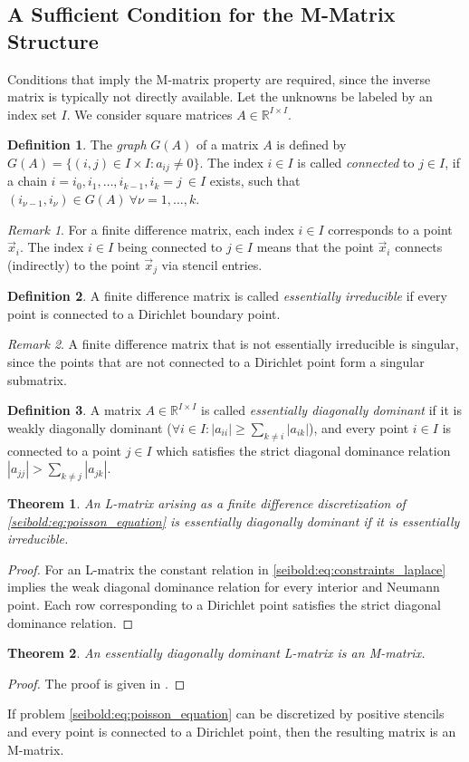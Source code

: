 \documentclass[reqno]{amsart}
\theoremstyle{plain}
\newtheorem{thm}{Theorem}
\theoremstyle{definition}
\newtheorem{defn}{Definition}
\theoremstyle{remark}
\newtheorem{rem}{Remark}
\begin{document}
\subsection{A Sufficient Condition for the M-Matrix Structure}
\label{seibold:subsec:mmatrix_suff_cond}
Conditions that imply the M-matrix property are required, since the inverse matrix is
typically not directly available.
Let the unknowns be labeled by an index set $I$. We consider square matrices
$A\in\mathbb{R}^{I\times I}$.
\begin{defn}
The \emph{graph} $G(A)$ of a matrix $A$ is defined by
$G(A) = \{(i,j)\in I\times I : a_{ij}\neq 0\}$.
The index $i\in I$ is called \emph{connected} to $j\in I$, if a chain
$i=i_0,i_1,\dots,i_{k-1},i_k=j \ \in I$ exists, such that
$(i_{\nu-1},i_\nu)\in G(A) \ \forall \nu=1,\dots,k$.
\end{defn}
\begin{rem}
For a finite difference matrix, each index $i\in I$ corresponds to a point $\vec{x}_i$.
The index $i\in I$ being connected to $j\in I$ means that the point $\vec{x}_i$
connects (indirectly) to the point $\vec{x}_j$ via stencil entries.
\end{rem}
\begin{defn}
A finite difference matrix is called \emph{essentially irreducible} if every point
is connected to a Dirichlet boundary point.
\end{defn}
\begin{rem}
A finite difference matrix that is not essentially irreducible is singular,
since the points that are not connected to a Dirichlet point form a singular submatrix.
\end{rem}
\begin{defn}
A matrix $A\in\mathbb{R}^{I\times I}$ is called \emph{essentially diagonally dominant}
if it is weakly diagonally dominant ($\forall i\in I: |a_{ii}|\ge\sum_{k\neq i}|a_{ik}|$),
and every point $i\in I$ is connected to a point $j\in I$ which satisfies the strict
diagonal dominance relation $|a_{jj}|>\sum_{k\neq j}|a_{jk}|$.
\end{defn}
\begin{thm}
\label{seibold:thm:ess_irred_is_ess_diagdom}
An L-matrix arising as a finite difference discretization of
\eqref{seibold:eq:poisson_equation} is essentially diagonally dominant if it is
essentially irreducible.
\end{thm}
\begin{proof}
For an L-matrix the constant relation in \eqref{seibold:eq:constraints_laplace}
implies the weak diagonal dominance relation for every interior and Neumann point.
Each row corresponding to a Dirichlet point satisfies the strict diagonal dominance
relation.
\end{proof}
\begin{thm}
\label{seibold:thm:Lmatrix_is_Mmatrix}
An essentially diagonally dominant L-matrix is an M-matrix.
\end{thm}
\begin{proof}
The proof is given in \cite[p.~153]{Hackbusch1994}.
\end{proof}
If problem \eqref{seibold:eq:poisson_equation} can be discretized by positive stencils
and every point is connected to a Dirichlet point, then the resulting matrix
is an M-matrix.
\end{document}
